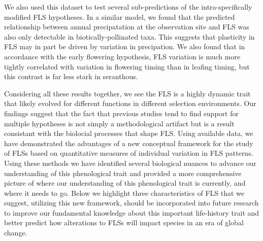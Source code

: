 \documentclass{article}
\begin{document}
We also used this dataset to test several sub-predictions of the intra-specifically modified FLS hypotheses. In a similar model, we found that the predicted relationship between annual precipatation  at the observation site and FLS was also only detectable in biotically-pollinated taxa. This suggests that plasticity in FLS may in part be driven by variation in precipation. We also found that in accordance with the early flowering hypothesis, FLS variation is much more tightly correlated with variation in flowering timing than in leafing timing, but this contrast is far less stark in seranthous.



Considering all these results together, we see the FLS is a highly dynamic trait that likely evolved for different functions in different selection environments. Our findings suggest that the fact that previous studies tend to find support for multiple hypotheses is not simply a methodological artifact but is a result consistant with the biolocial processes that shape FLS. Using available data, we have demonstrated the advantages of a new conceptual framework for the study of FLSs based on quantitative measures of individual variation in FLS patterns. Using these methods we have identified several biological nuances to advance our understanding of this phenological trait and provided a more comprehensive picture of where our understanding of this phenological trait is currently, and where it needs to go. Below we highlight three characteristics of FLS that we suggest, utilizing this new framework, should be incorporated into future research to improve our fundamental knowledge about this important life-history trait and better predict how alterations to FLSs will impact species in an era of global change.
\end{document}
